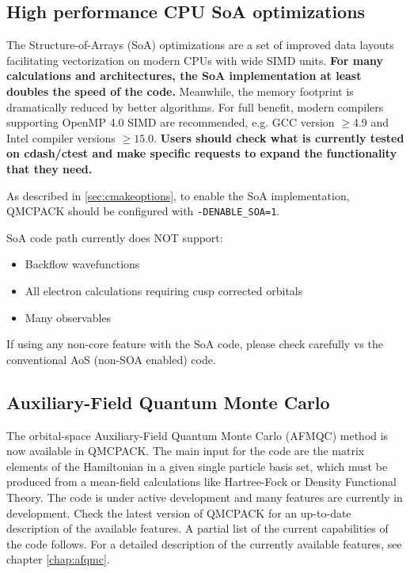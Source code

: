 \subsection{High performance CPU SoA optimizations}
The Structure-of-Arrays (SoA) optimizations \cite{IPCC_SC17} are a set
of improved data layouts facilitating vectorization on modern CPUs
with wide SIMD units. \textbf{For many calculations and architectures, the SoA
  implementation at least doubles the speed of the code.}  Meanwhile,
the memory footprint is dramatically reduced by better algorithms. For full benefit, modern
compilers supporting OpenMP 4.0 SIMD are recommended, e.g. GCC version
$\ge$4.9 and Intel compiler versions $\ge 15.0$. \textbf{Users should
  check what is currently tested on cdash/ctest and make specific
  requests to expand the functionality that they need.}

As described in \ref{sec:cmakeoptions}, to enable the SoA
implementation, QMCPACK should be configured with \texttt{-DENABLE\_SOA=1}.

SoA code path currently does NOT support:
\begin{itemize}
  \item Backflow wavefunctions
  \item All electron calculations requiring cusp corrected orbitals
  \item Many observables
\end{itemize}

If using any non-core feature with the SoA code, please check carefully vs the conventional AoS (non-SOA enabled) code.

\subsection{Auxiliary-Field Quantum Monte Carlo}

The orbital-space Auxiliary-Field Quantum Monte Carlo (AFMQC) method is now available in QMCPACK. The main input for the code are the matrix elements of the Hamiltonian in a given single particle basis set, which must be produced from a mean-field calculations like Hartree-Fock or Density Functional Theory. The code is under active development and many features are currently in development. Check the latest version of QMCPACK for an up-to-date description of the available features. A partial list of the current capabilities of the code follows. For a detailed description of the currently available features, see chapter \ref{chap:afqmc}.
 

